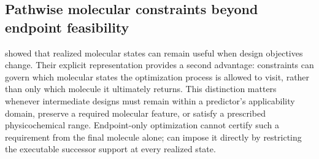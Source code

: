 \subsection{Pathwise molecular constraints beyond endpoint feasibility}
\label{sec:exp-pathwise}

 showed that realized molecular states can remain useful when design objectives change. Their explicit representation provides a second advantage: constraints can govern which molecular states the optimization process is allowed to visit, rather than only which molecule it ultimately returns. This distinction matters whenever intermediate designs must remain within a predictor's applicability domain, preserve a required molecular feature, or satisfy a prescribed physicochemical range. Endpoint-only optimization cannot certify such a requirement from the final molecule alone; \method{} can impose it directly by restricting the executable successor support at every realized state.

